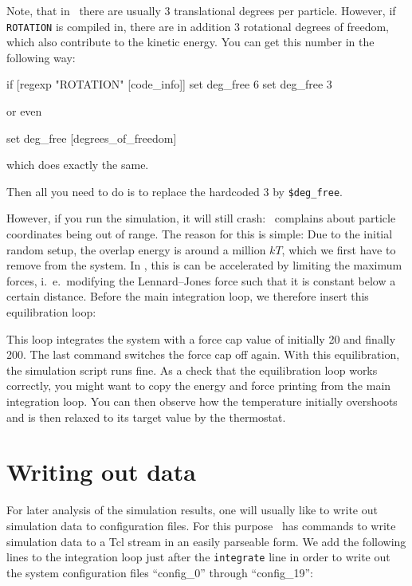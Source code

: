 \documentclass[
a4paper,                        %
11pt,                           %
twoside,                        %
footsepline,                    %
headsepline,                    %
headexclude,                    %
footexclude,                    %
pagesize,                       %
]{scrartcl}
\begin{document}
Note, that in \es\ there are usually 3 translational degrees per
particle. However, if \verb|ROTATION| is compiled in, there are in
addition 3 rotational degrees of freedom, which also contribute to the
kinetic energy.  You can get this number in the following way:

\begin{tclcode}
  if { [regexp "ROTATION" [code_info]] } {
    set deg_free 6
  } {
    set deg_free 3
  }
\end{tclcode}
or even
\begin{tclcode}
    set deg_free [degrees_of_freedom]
\end{tclcode}
which does exactly the same.

Then all you need to do is to replace the hardcoded 3 by \verb|$deg_free|.

However, if you run the simulation, it will still
crash: \es\ complains about particle coordinates being out of range.
The reason for this is simple: Due to the initial random setup, the
overlap energy is around a million $kT$, which we first have to remove
from the system. In \es, this is can be accelerated by limiting the maximum
forces, i.~e.\ modifying the Lennard--Jones force such that it is
constant below a certain distance. Before the main integration loop, we
therefore insert this equilibration loop:


This loop integrates the system with a force cap value of initially 20 and
finally 200.  The last command switches the force cap off again. With
this equilibration, the simulation script runs fine. As a check
that the equilibration loop works correctly, you might want to copy the
energy and force printing from the main integration loop. You can then
observe how the temperature initially overshoots and is then relaxed to
its target value by the thermostat.

\section{Writing out data}

For later analysis of the simulation results, one will
usually like to write out simulation data to configuration files.
For this purpose \es\ has commands to write simulation
data to a Tcl stream in an easily parseable form.  We add the following
lines to the integration loop just after the \verb|integrate| line
in order to write out the system configuration files
``config\_0'' through ``config\_19'':
\end{document}
